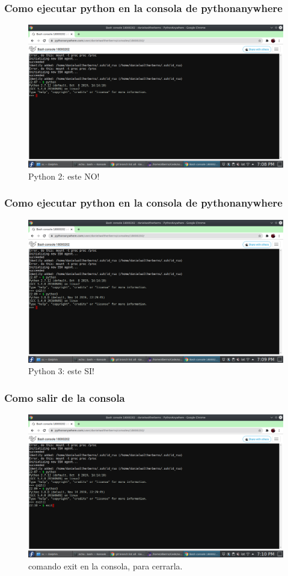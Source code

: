 \documentclass[11pt]{beamer}
\begin{document}
\begin{frame}
	\frametitle{Como ejecutar python en la consola de pythonanywhere}
	\begin{figure}
		\centering
		\includegraphics[width=0.7\linewidth]{sc/bash_python_2}
		\caption{Python 2: este NO!}
	\end{figure}
	
\end{frame}

\begin{frame}
	\frametitle{Como ejecutar python en la consola de pythonanywhere}
	\begin{figure}
		\centering
		\includegraphics[width=0.7\linewidth]{sc/bash_python_3}
		\caption{Python 3: este SI!}
	\end{figure}
	
\end{frame}

\begin{frame}
	\frametitle{Como salir de la consola}
	\begin{figure}
		\centering
		\includegraphics[width=0.7\linewidth]{sc/bash_exit}
		\caption{comando exit en la consola, para cerrarla.}
	\end{figure}
	
\end{frame}
\end{document}
